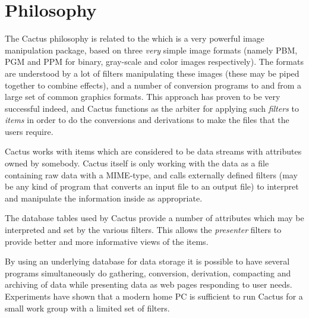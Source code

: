\section{Philosophy}
\label{sec:cactus-philosophy}

The Cactus philosophy is related to the
 which is a very
powerful image manipulation package, based on three
\textit{very} simple image formats (namely PBM, PGM and PPM
for binary, gray-scale and color images respectively).  The
formats are understood by a lot of filters manipulating
these images (these may be piped together to combine
effects), and a number of conversion programs to and from a
large set of common graphics formats.  This approach has
proven to be very successful indeed, and Cactus functions as
the arbiter for applying such \textit{filters} to
\textit{items} in order to do the conversions and
derivations to make the files that the users require.

Cactus works with items which are considered to be data
streams with attributes owned by somebody.  Cactus itself is
only working with the data as a file containing raw data
with a MIME-type, and calls externally defined filters (may
be any kind of program that converts an input file to an
output file) to interpret and manipulate the information
inside as appropriate.

The database tables used by Cactus provide a number of
attributes which may be interpreted and set by the various
filters.  This allows the \textit{presenter} filters to
provide better and more informative views of the items.

By using an underlying database for data storage it is
possible to have several programs simultaneously do
gathering, conversion, derivation, compacting and
archiving of data while presenting data as web pages
responding to user needs. Experiments have shown that a
modern home PC is sufficient to run Cactus for a small work
group with a limited set of filters.





